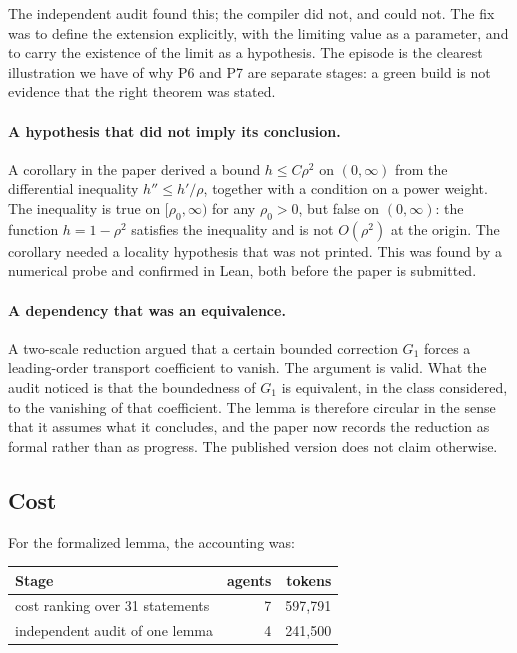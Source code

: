 \documentclass[11pt]{article}
\newcommand{\Lean}{Lean}
\begin{document}
The independent audit found this; the compiler did not, and could not. The fix
was to define the extension explicitly, with the limiting value as a parameter,
and to carry the existence of the limit as a hypothesis. The episode is the
clearest illustration we have of why P6 and P7 are separate stages: a green
build is not evidence that the right theorem was stated.

\paragraph{A hypothesis that did not imply its conclusion.}
A corollary in the paper derived a bound $h \le C\rho^2$ on $(0,\infty)$ from
the differential inequality $h'' \le h'/\rho$, together with a condition on a
power weight. The inequality is true on $[\rho_0,\infty)$ for any
$\rho_0>0$, but false on $(0,\infty)$: the function $h = 1-\rho^2$ satisfies
the inequality and is not $O(\rho^2)$ at the origin. The corollary needed a
locality hypothesis that was not printed. This was found by a numerical probe
and confirmed in \Lean, both before the paper is submitted.

\paragraph{A dependency that was an equivalence.}
A two-scale reduction argued that a certain bounded correction $G_1$ forces a
leading-order transport coefficient to vanish. The argument is valid. What the
audit noticed is that the boundedness of $G_1$ is equivalent, in the class
considered, to the vanishing of that coefficient. The lemma is therefore
circular in the sense that it assumes what it concludes, and the paper now
records the reduction as formal rather than as progress. The published version
does not claim otherwise.

\subsection{Cost}

For the formalized lemma, the accounting was:

\begin{center}
\begin{tabular}{@{}lrr@{}}
\toprule
Stage & agents & tokens \\
\midrule
cost ranking over 31 statements & 7 & 597{,}791 \\
independent audit of one lemma & 4 & 241{,}500 \\
\bottomrule
\end{tabular}
\end{center}
\end{document}
